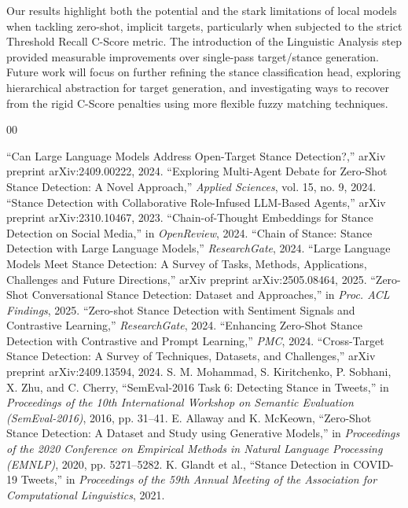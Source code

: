 \documentclass[conference]{IEEEtran}
\begin{document}
Our results highlight both the potential and the stark limitations of local models when tackling zero-shot, implicit targets, particularly when subjected to the strict Threshold Recall C-Score metric. The introduction of the Linguistic Analysis step provided measurable improvements over single-pass target/stance generation. Future work will focus on further refining the stance classification head, exploring hierarchical abstraction for target generation, and investigating ways to recover from the rigid C-Score penalties using more flexible fuzzy matching techniques.

\begin{thebibliography}{00}

 ``Can Large Language Models Address Open-Target Stance Detection?,'' arXiv preprint arXiv:2409.00222, 2024.
 ``Exploring Multi-Agent Debate for Zero-Shot Stance Detection: A Novel Approach,'' \textit{Applied Sciences}, vol. 15, no. 9, 2024.
 ``Stance Detection with Collaborative Role-Infused LLM-Based Agents,'' arXiv preprint arXiv:2310.10467, 2023.
 ``Chain-of-Thought Embeddings for Stance Detection on Social Media,'' in \textit{OpenReview}, 2024.
 ``Chain of Stance: Stance Detection with Large Language Models,'' \textit{ResearchGate}, 2024.
 ``Large Language Models Meet Stance Detection: A Survey of Tasks, Methods, Applications, Challenges and Future Directions,'' arXiv preprint arXiv:2505.08464, 2025.
 ``Zero-Shot Conversational Stance Detection: Dataset and Approaches,'' in \textit{Proc. ACL Findings}, 2025.
 ``Zero-shot Stance Detection with Sentiment Signals and Contrastive Learning,'' \textit{ResearchGate}, 2024.
 ``Enhancing Zero-Shot Stance Detection with Contrastive and Prompt Learning,'' \textit{PMC}, 2024.
 ``Cross-Target Stance Detection: A Survey of Techniques, Datasets, and Challenges,'' arXiv preprint arXiv:2409.13594, 2024.
 S. M. Mohammad, S. Kiritchenko, P. Sobhani, X. Zhu, and C. Cherry, ``SemEval-2016 Task 6: Detecting Stance in Tweets,'' in \textit{Proceedings of the 10th International Workshop on Semantic Evaluation (SemEval-2016)}, 2016, pp. 31--41.
 E. Allaway and K. McKeown, ``Zero-Shot Stance Detection: A Dataset and Study using Generative Models,'' in \textit{Proceedings of the 2020 Conference on Empirical Methods in Natural Language Processing (EMNLP)}, 2020, pp. 5271--5282.
 K. Glandt et al., ``Stance Detection in COVID-19 Tweets,'' in \textit{Proceedings of the 59th Annual Meeting of the Association for Computational Linguistics}, 2021.

\end{thebibliography}
\end{document}
